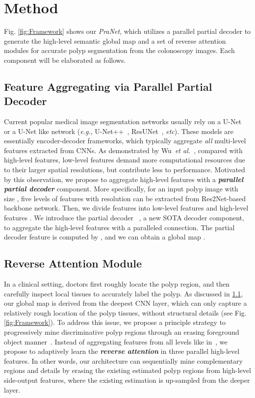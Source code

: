 \documentclass[runningheads]{llncs}
\newcommand{\secref}[1]{ \ref{#1}}
\newcommand{\figref}[1]{Fig. \ref{#1}}
\def\etal{{\em et al.}}
\def\eg{\emph{e.g.}}
\def\etc{\emph{etc}}
\def\etal{{\em et al.~}}
\def\ourmodel{\textit{PraNet}}
\begin{document}
\section{Method}\label{sec:Methods}
\figref{fig:Framework} shows our \ourmodel, which utilizes a  parallel partial decoder to generate the high-level semantic global map and a set of reverse attention modules for accurate polyp segmentation from the colonoscopy images. Each component will be elaborated as follows. 

\subsection{Feature Aggregating via Parallel Partial Decoder}\label{sec:PPD}
Current popular medical image segmentation networks usually rely on a U-Net~\cite{ronneberger2015u} or a U-Net like network (\eg, U-Net++~\cite{zhou2018unetplus}, ResUNet~\cite{zhang2018road}, \etc). 
These models are essentially encoder-decoder frameworks, which typically aggregate \textit{all} multi-level features extracted from CNNs. As demonstrated by Wu~\etal\cite{wu2019cascaded}, compared with high-level features, low-level features demand more computational resources due to their larger spatial resolutions, but contribute less to performance.
Motivated by this observation, we propose to aggregate high-level features with a \textbf{\textit{parallel partial decoder}} component. More specifically, for an input polyp image  with size , five levels of features  with resolution  can be extracted from Res2Net-based~\cite{pami20Res2net} backbone network.
Then, we divide  features into low-level features  and high-level features . We introduce the partial decoder ~\cite{wu2019cascaded}, a new SOTA decoder component, to aggregate the high-level features with a paralleled connection. The partial decoder feature is computed by , and we can obtain a global map .

\subsection{Reverse Attention Module}
In a clinical setting, doctors first roughly locate the polyp region, and then carefully inspect local tissues to accurately label the polyp.
As discussed in \secref{sec:PPD}, our global map  is derived from the deepest CNN layer, which can only capture a relatively rough location of the polyp tissues, without structural details (see \figref{fig:Framework}).
To address this issue, we propose a principle strategy to progressively mine discriminative polyp regions through an erasing foreground object manner~\cite{wei2017object,chen2018reverse}. Instead of aggregating features from all levels like in~\cite{chen2018reverse,Gu2019,ETNet2019,AGNet}, we propose to adaptively learn the \textit{\textbf{reverse attention}} in three parallel high-level features. In other words, our architecture can sequentially mine complementary 
regions and details by erasing the existing estimated polyp regions from high-level side-output features, where the existing estimation is up-sampled from the deeper layer.
\end{document}

